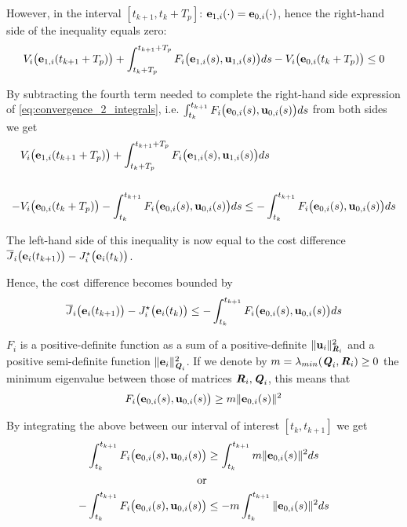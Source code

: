 \begin{gg_box}
  However, in the interval $[t_{k+1}, t_k + T_p]$:
  $\bm{\mathbf{e}}_{1,i}(\cdot) = \bm{\mathbf{e}}_{0,i}(\cdot)$, hence the right-hand
  side of the inequality equals zero:
  \begin{align}
    V_i\big(\bm{\mathbf{e}}_{1,i}(t_{k+1} + T_p)\big)
    + \int_{t_k + T_p}^{t_{k+1} + T_p} F_i\big(\bm{\mathbf{e}}_{1,i}(s), \bm{\mathbf{u}}_{1,i}(s)\big) ds
    - V_i\big(\bm{\mathbf{e}}_{0,i}(t_k + T_p)\big) \leq 0
  \end{align}

  By subtracting the fourth term needed to complete the right-hand side
  expression of \eqref{eq:convergence_2_integrals}, i.e.
  $\int_{t_k}^{t_{k+1}} F_i \big(\bm{\mathbf{e}}_{0,i}(s), \bm{\mathbf{u}}_{0,i} (s)\big) d s$
  from both sides we get
  \begin{align}
    &V_i\big(\bm{\mathbf{e}}_{1,i}(t_{k+1} + T_p)\big)
    + \int_{t_k + T_p}^{t_{k+1} + T_p} F_i\big(\bm{\mathbf{e}}_{1,i}(s), \bm{\mathbf{u}}_{1,i}(s)\big) ds \\\\
    - &V_i\big(\bm{\mathbf{e}}_{0,i}(t_k + T_p)\big)
    -\int_{t_k}^{t_{k+1}} F_i \big(\bm{\mathbf{e}}_{0,i}(s), \bm{\mathbf{u}}_{0,i} (s)\big) d s
    \leq -\int_{t_k}^{t_{k+1}} F_i \big(\bm{\mathbf{e}}_{0,i}(s), \bm{\mathbf{u}}_{0,i} (s)\big) d s
  \end{align}

  The left-hand side of this inequality is now equal to the cost difference
  $\overline{J}_i\big(\bm{\mathbf{e}}_i(t_{k+1})\big) - J_i^{\star}\big(\bm{\mathbf{e}}_i(t_k)\big)$.
\end{gg_box}
Hence, the cost difference becomes bounded by
\begin{align}
  \overline{J}_i\big(\bm{\mathbf{e}}_i(t_{k+1})\big) - J_i^{\star}\big(\bm{\mathbf{e}}_i(t_k)\big) \leq
    -\int_{t_k}^{t_{k+1}} F_i \big(\bm{\mathbf{e}}_{0,i}(s), \bm{\mathbf{u}}_{0,i} (s)\big) ds
\end{align}
\begin{gg_box}
  $F_i$ is a positive-definite function as a sum of a positive-definite
  $\|\bm{\mathbf{u}}_i\|^2_{\bm{\mathit{R}}_i}$ and a positive semi-definite function
  $\|\bm{\mathbf{e}}_i\|^2_{\bm{\mathit{Q}}_i}$. If we denote by
  $m = \lambda_{min}(\bm{\mathit{Q}}_i, \bm{\mathit{R}}_i) \geq 0$ the minimum eigenvalue
  between those of matrices $\bm{\mathit{R}}_i, \bm{\mathit{Q}}_i$, this means that
  \begin{align}
    F_i \big(\bm{\mathbf{e}}_{0,i}(s), \bm{\mathbf{u}}_{0,i} (s)\big) \geq m \|\bm{\mathbf{e}}_{0,i}(s)\|^2
  \end{align}

  By integrating the above between our interval of interest $[t_k, t_{k+1}]$ we get
  \begin{align}
    \int_{t_k}^{t_{k+1}} F_i \big(\bm{\mathbf{e}}_{0,i}(s), \bm{\mathbf{u}}_{0,i} (s)\big) &\geq \int_{t_k}^{t_{k+1}} m \|\bm{\mathbf{e}}_{0,i}(s)\|^2 ds \\
    \text{or}\\
    -\int_{t_k}^{t_{k+1}} F_i \big(\bm{\mathbf{e}}_{0,i}(s), \bm{\mathbf{u}}_{0,i} (s)\big) &\leq -m \int_{t_k}^{t_{k+1}} \|\bm{\mathbf{e}}_{0,i}(s)\|^2 ds
  \end{align}
\end{gg_box}


